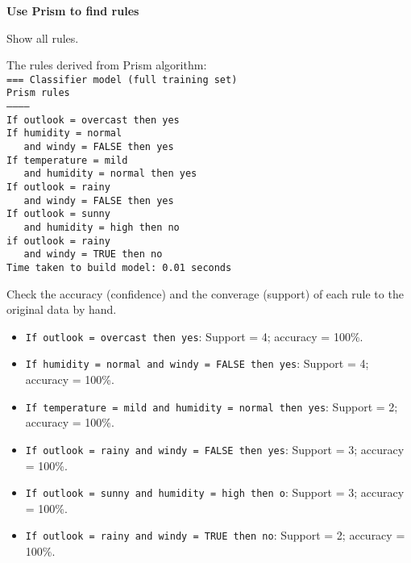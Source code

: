 \documentclass[12pt,twoside]{article}
\begin{document}
\begin{exercises}
\begin{exerciseparts}
\end{exerciseparts}

\problem \textbf{Use Prism to find rules}

\begin{exerciseparts}

\exercisepart
Show all rules.

\ifsolution \solution{}
The rules derived from Prism algorithm: \\
\texttt{=== Classifier model (full training set)} \\
\texttt{Prism rules} \\
\texttt{-----------} \\
\texttt{If outlook = overcast then yes} \\
\texttt{If humidity = normal} \\
\texttt{~~~and windy = FALSE then yes} \\
\texttt{If temperature = mild} \\
\texttt{~~~and humidity = normal then yes} \\
\texttt{If outlook = rainy} \\
\texttt{~~~and windy = FALSE then yes} \\
\texttt{If outlook = sunny} \\
\texttt{~~~and humidity = high then no} \\
\texttt{if outlook = rainy} \\
\texttt{~~~and windy = TRUE then no} \\
\texttt{Time taken to build model: 0.01 seconds}
\fi

\exercisepart
Check the accuracy (confidence) and the converage
(support) of each rule to the original data by hand.

\ifsolution \solution{}
\begin{itemize}
  \item \texttt{If outlook = overcast then yes}: Support = 4; accuracy = 100\%.
  \item \texttt{If humidity = normal and windy = FALSE then yes}: Support = 4; accuracy = 100\%.
  \item \texttt{If temperature = mild and humidity = normal then yes}: Support = 2; accuracy = 100\%.
  \item \texttt{If outlook = rainy and windy = FALSE then yes}: Support = 3; accuracy = 100\%.
  \item \texttt{If outlook = sunny and humidity = high then o}: Support = 3; accuracy = 100\%.
  \item \texttt{If outlook = rainy and windy = TRUE then no}: Support = 2; accuracy = 100\%.
\end{itemize}
\fi


\end{exerciseparts}
\end{exercises}
\end{document}
